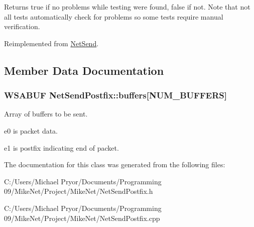 \begin{DoxyReturn}{Returns}
true if no problems while testing were found, false if not. Note that not all tests automatically check for problems so some tests require manual verification. 
\end{DoxyReturn}


Reimplemented from \hyperlink{class_net_send_ab93dd370f3117ed82eec3993ba0be71d}{NetSend}.



\subsection{Member Data Documentation}
\hypertarget{class_net_send_postfix_a36aafafb7f8795742b03165f4398bf7d}{
\subsubsection[{buffers}]{\setlength{\rightskip}{0pt plus 5cm}WSABUF {\bf NetSendPostfix::buffers}\mbox{[}{\bf NUM\_\-BUFFERS}\mbox{]}}}
\label{class_net_send_postfix_a36aafafb7f8795742b03165f4398bf7d}


Array of buffers to be sent. 


\begin{DoxyItemize}
\item e0 is packet data.
\item e1 is postfix indicating end of packet. 
\end{DoxyItemize}

The documentation for this class was generated from the following files:\begin{DoxyCompactItemize}
\item 
C:/Users/Michael Pryor/Documents/Programming 09/MikeNet/Project/MikeNet/NetSendPostfix.h\item 
C:/Users/Michael Pryor/Documents/Programming 09/MikeNet/Project/MikeNet/NetSendPostfix.cpp\end{DoxyCompactItemize}
